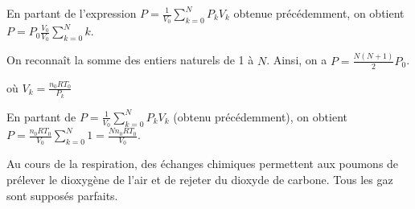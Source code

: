 \begin{corrige}
En partant de l'expression $P=\frac{1}{V_0} \sum_{k=0}^N P_k V_k$ obtenue précédemment, on obtient $P=P_0 \frac{V_0}{V_0} \sum_{k=0}^N k$. 

On reconnaît la somme des entiers naturels de 1 à $N$. Ainsi, on a $P=\frac{N(N+1)}{2} P_0$.
\end{corrige}



\begin{enonce}
où $V_k=\frac{n_0RT_0}{P_k}$
\end{enonce}


\begin{corrige}
En partant de $P=\frac{1}{V_0} \sum_{k=0}^N P_k V_k$ (obtenu précédemment), on obtient $P=\frac{n_0 R T_0}{V_0} \sum_{k=0}^N 1=\frac{N n_0 R T_0}{V_0}$.
\end{corrige}



\finEntrainement








\hauteurLargeurCadreReponse		{7mm}{3.5cm}
\initialisationEntrainement

Au cours de la respiration, des échanges chimiques permettent aux poumons de prélever le dioxygène de l'air et de rejeter du dioxyde de carbone. Tous les gaz sont supposés parfaits.

